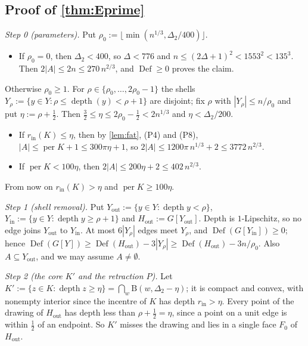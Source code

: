 \documentclass[11pt]{amsart}
\theoremstyle{definition}
\theoremstyle{remark}
\newcommand{\Dt}{\Delta_2}
\newcommand{\Dd}{\mathrm{B}}      %
\begin{document}
\subsection{Proof of \texorpdfstring{\cref{thm:Eprime}}{Theorem E'}}
\emph{Step 0 (parameters).} Put $\rho_0:=\lfloor\min(n^{1/3},\Dt/400)\rfloor$.
\begin{itemize}[leftmargin=2em]
\item[(F1)] If $\rho_0=0$, then $\Dt<400$, so $\Delta<776$ and $n\le(2\Delta+1)^2<1553^2<135^3$. Then $2|A|\le2n\le270\,n^{2/3}$, and $\operatorname{Def}\ge0$ proves the claim.
\end{itemize}
Otherwise $\rho_0\ge1$. For $\rho\in\{\rho_0,\dots,2\rho_0-1\}$ the shells $Y_\rho:=\{y\in Y:\rho\le\operatorname{depth}(y)<\rho+1\}$ are disjoint; fix $\rho$ with $|Y_\rho|\le n/\rho_0$ and put $\eta:=\rho+\frac12$. Then $\frac32\le\eta\le2\rho_0-\frac12<2n^{1/3}$ and $\eta<\Dt/200$.
\begin{itemize}[leftmargin=2em]
\item[(F2)] If $r_{\mathrm{in}}(K)\le\eta$, then by \cref{lem:fat}, (P4) and (P8), $|A|\le\operatorname{per}K+1\le300\pi\eta+1$, so $2|A|\le1200\pi\,n^{1/3}+2\le3772\,n^{2/3}$.
\item[(F3)] If $\operatorname{per}K<100\eta$, then $2|A|\le200\eta+2\le402\,n^{2/3}$.
\end{itemize}
From now on $r_{\mathrm{in}}(K)>\eta$ and $\operatorname{per}K\ge100\eta$.

\emph{Step 1 (shell removal).} Put $Y_{\mathrm{out}}:=\{y\in Y:\operatorname{depth}y<\rho\}$, $Y_{\mathrm{in}}:=\{y\in Y:\operatorname{depth}y\ge\rho+1\}$ and $H_{\mathrm{out}}:=G[Y_{\mathrm{out}}]$. Depth is $1$-Lipschitz, so no edge joins $Y_{\mathrm{out}}$ to $Y_{\mathrm{in}}$. At most $6|Y_\rho|$ edges meet $Y_\rho$, and $\operatorname{Def}(G[Y_{\mathrm{in}}])\ge0$; hence $\operatorname{Def}(G[Y])\ge\operatorname{Def}(H_{\mathrm{out}})-3|Y_\rho|\ge\operatorname{Def}(H_{\mathrm{out}})-3n/\rho_0$. Also $A\subseteq Y_{\mathrm{out}}$, and we may assume $A\neq\emptyset$.

\emph{Step 2 (the core $K'$ and the retraction $P$).} Let $K':=\{z\in K:\operatorname{depth}z\ge\eta\}=\bigcap_w\Dd(w,\Dt-\eta)$; it is compact and convex, with nonempty interior since the incentre of $K$ has depth $r_{\mathrm{in}}>\eta$. Every point of the drawing of $H_{\mathrm{out}}$ has depth less than $\rho+\frac12=\eta$, since a point on a unit edge is within $\frac12$ of an endpoint. So $K'$ misses the drawing and lies in a single face $F_0$ of $H_{\mathrm{out}}$.
\end{document}

